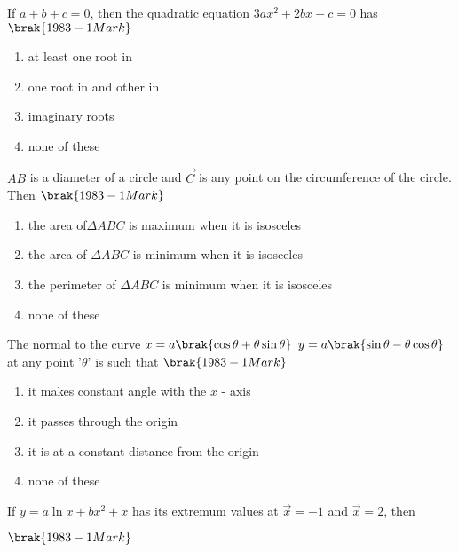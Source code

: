 \iffalse
\title{Assignment}
\author{ee24btech11056-S.Kavya Anvitha}
\section{mcq-single} 
\fi


\item If $a+b+c = 0$, then the quadratic equation $3ax^2 + 2bx + c = 0$
has \hfill$\brak{1983 - 1 Mark}$
\begin{enumerate}
	\item at least one root in
	\item one root in  and other in 
        \item imaginary roots
	\item none of these
\end{enumerate}

 \item $AB$ is a diameter of a circle and $\vec C$ is any point on the
circumference of the circle. Then
\hfill$\brak{1983 - 1 Mark}$
\begin{enumerate}
	\item the area of$\Delta ABC$ is maximum when it is isosceles
	\item the area of $\Delta ABC$ is minimum when it is isosceles
	\item the perimeter of $\Delta ABC$ is minimum when it is isosceles
	\item none of these
\end{enumerate}

\item The normal to the curve 
$x = a\brak{\cos \theta + \theta\sin \theta}$
$y = a\brak{\sin \theta - \theta\cos \theta}$
at any point '$\theta$' is such that \hfill$\brak{1983 - 1 Mark}$
\begin{enumerate}
	\item it makes  constant angle with the $x$ - axis
	\item it passes through the origin
	\item it is at a constant distance from the origin
	\item none of these
\end{enumerate}

\item If $y=a\ln x + bx^2 +x$ has its extremum values at 
$\vec x = -1$ and $\vec x = 2$, then


\hfill$\brak{1983 - 1 Mark}$

